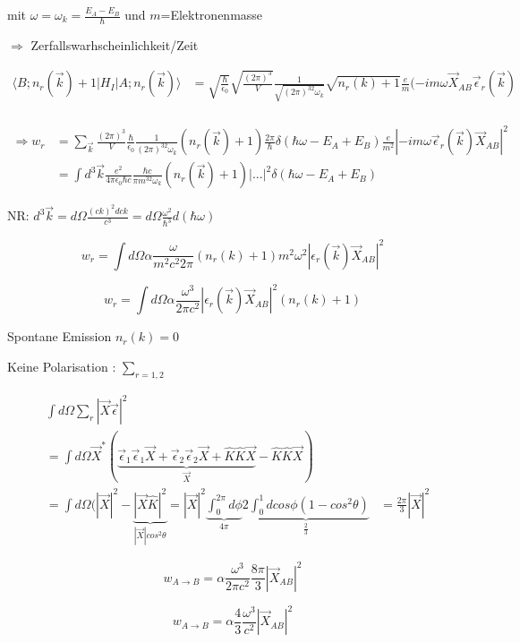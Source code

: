 mit \(\omega = \omega_k = \frac{E_A-E_B}{\hbar}\) und \(m\)=Elektronenmasse


\(\Rightarrow \) Zerfallswarhscheinlichkeit/Zeit


\begin{align}
\langle B;n_r(\vec k) +1 |H_I|A;n_r(\vec k)\rangle &= \sqrt{\frac{\hbar}{\epsilon_0}}\sqrt{\frac{(2\pi)^3}{V}}\frac{1}{\sqrt{(2\pi)^32\omega_k}}\sqrt{n_r(k)+1}\frac{e}{m}(-im\omega\vec X_{AB}\vec \epsilon_r(\vec k) \\
\end{align}


\begin{align}
\Rightarrow w_r &= \sum_{\vec k}\frac{(2\pi)^3}{V} \frac{\hbar}{\epsilon_0}\frac{1}{(2\pi)^32\omega_k}(n_r(\vec k)+1)\frac{2\pi}{\hbar}\delta(\hbar\omega-E_A+E_B)\frac{e}{m^2} |-im\omega\vec\epsilon_r(\vec k)\vec X_{AB}|^2\\
&=\int d^3\vec k\frac{e^2}{4\pi\epsilon_0\hbar c}\frac{\hbar c}{\pi m^32\omega_k}(n_r(\vec k)+1)|...|^2 \delta(\hbar\omega-E_A+E_B)
\end{align}

NR: \(d^3\vec k = d\Omega \frac{(ck)^2 dck}{c^3} = d\Omega \frac{\omega^2}{\hbar^3}d(\hbar\omega)\)



\[w_r = \int d\Omega \alpha \frac{\omega}{m^2c^2 2\pi}(n_r(k) +1) m^2\omega^2|\epsilon_r(\vec k)\vec X_{AB}|^2\]

\[\boxed{w_r = \int d\Omega \alpha \frac{\omega^3}{2\pi c^2} |\epsilon_r(\vec k)\vec X_{AB}|^2 (n_r(k) +1)}\]

Spontane Emission \(n_r(k) = 0\)


Keine Polarisation : \(\sum_{r=1,2}\)

\begin{align}
&\int d\Omega \sum_r|\vec X\vec \epsilon|^2\\
&=\int d\Omega \vec X^*(\underbrace{\vec \epsilon_1\vec \epsilon_1\vec X+\vec \epsilon_2\vec \epsilon_2\vec X +\hat K\hat K\vec X}_{\vec X}-\hat K\hat K\vec X)\\
&=\int d\Omega (|\vec X|^2-\underbrace{|\vec X\hat K|^2}_{|\vec X|cos^2\theta} = |\vec X|^2 \underbrace{\int_0^{2\pi}d\phi}_{4\pi}\underbrace{2\int_0^1dcos\phi(1-cos^2\theta)}_{\frac{2}{3}}
&=\frac{2\pi}{3}|\vec X|^2
\end{align}

\[w_{A\to B}= \alpha \frac{\omega^3}{2\pi c^2}\frac{8\pi}{3}|\vec X_{AB}|^2\]

\[\boxed{w_{A\to B}= \alpha\frac{4}{3} \frac{\omega^3}{c^2}|\vec X_{AB}|^2}\]


